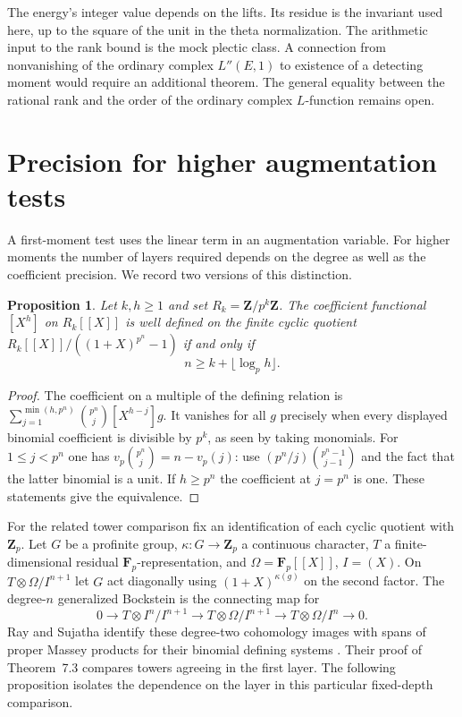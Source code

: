 \documentclass[11pt]{article}
\newtheorem{proposition}[theorem]{Proposition}
\newcommand{\Z}{\mathbf Z}
\newcommand{\F}{\mathbf F}
\begin{document}
The energy's integer value depends on the lifts. Its residue is the invariant used here, up to the square of the unit in the theta normalization. The arithmetic input to the rank bound is the mock plectic class. A connection from nonvanishing of the ordinary complex \(L''(E,1)\) to existence of a detecting moment would require an additional theorem. The general equality between the rational rank and the order of the ordinary complex \(L\)-function remains open.

\section{Precision for higher augmentation tests}\label{sec:depth}
A first-moment test uses the linear term in an augmentation variable.
For higher moments the number of layers required depends on the
degree as well as the coefficient precision. We record two versions
of this distinction.

\begin{proposition}\label{prop:coeff-depth}
Let $k,h\ge1$ and set $R_k=\Z/p^k\Z$. The coefficient functional
$[X^h]$ on $R_k[[X]]$ is well defined on the finite cyclic quotient
$R_k[[X]]/((1+X)^{p^n}-1)$ if and only if
\[
                   n\ge k+\lfloor\log_p h\rfloor .
\]
\end{proposition}
\begin{proof}
The coefficient on a multiple of the defining relation is
$\sum_{j=1}^{\min(h,p^n)}\binom{p^n}{j}[X^{h-j}]g$.
It vanishes for all $g$ precisely when every displayed binomial
coefficient is divisible by $p^k$, as seen by taking monomials.
For $1\le j<p^n$ one has
$v_p\binom{p^n}{j}=n-v_p(j)$: use
$(p^n/j)\binom{p^n-1}{j-1}$ and the fact that the latter binomial is
a unit. If $h\ge p^n$ the coefficient at $j=p^n$ is one.
These statements give the equivalence.
\end{proof}

For the related tower comparison fix an identification of each cyclic
quotient with $\Z_p$. Let $G$ be a profinite group, $\kappa:G\to\Z_p$
a continuous character, $T$ a finite-dimensional residual
$\F_p$-representation, and $\Omega=\F_p[[X]]$, $I=(X)$.
On $T\otimes\Omega/I^{n+1}$ let $G$ act diagonally using
$(1+X)^{\kappa(g)}$ on the second factor. The degree-$n$ generalized
Bockstein is the connecting map for
\[
 0\to T\otimes I^n/I^{n+1}\to T\otimes\Omega/I^{n+1}
 \to T\otimes\Omega/I^n\to0 .
\]
Ray and Sujatha identify these degree-two cohomology images with
spans of proper Massey products for their binomial defining systems
\cite[\S6.2]{RS}. Their proof of Theorem~7.3 compares towers agreeing
in the first layer. The following proposition isolates the dependence
on the layer in this particular fixed-depth comparison.
\end{document}
